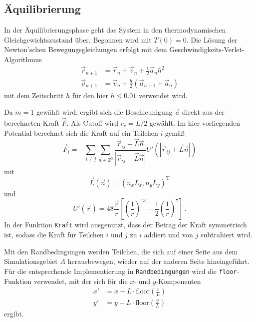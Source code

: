 \subsection*{Äquilibrierung}
In der Äquilibrierungsphase geht das System in den thermodynamischen Gleichgewichtszustand über.
Begonnen wird mit $T(0) = 0$. Die Lösung der Newton'schen Bewegungsgleichungen erfolgt mit dem Geschwindigkeits-Verlet-Algorithmus
\begin{align*}
    \vec{r}_{n+1} &= \vec{r}_n + \vec{v}_n + \frac{1}{2} \vec{a}_n h^2 \\
    \vec{v}_{n+1} &= \vec{v}_n + \frac{h}{2} \left(\vec{a}_{n+1} + \vec{a}_{n}\right)
\end{align*}
mit dem Zeitschritt $h$ für den hier $h \leq 0.01$ verwendet wird. 

Da $m = 1$ gewählt wird, ergibt sich die Beschleunigung $\vec{a}$ direkt aus der berechneten Kraft $\vec{F}$.
Als Cutoff wird $r_c = L/2$ gewählt. Im hier vorliegenden Potential berechnet sich die Kraft auf ein Teilchen $i$ gemäß
\begin{equation*}
    \vec{F}_{i} = - \sum_{i \neq j} \sum_{\vec{n} \in \mathbb{Z}^3} \frac{\vec{r}_{ij} + \vec{L} \vec{n}}{\left|\vec{r}_{ij} + \vec{L} \vec{n}\right|} U'\left(\left|\vec{r}_{ij} + \vec{L} \vec{n}\right|\right)
\end{equation*}
mit
\begin{equation*}
    \vec{L} \left(\vec{n}\right) = \left(n_x L_x, n_y L_y\right)^{\text{T}}
\end{equation*}
und 
\begin{equation*}
    U' \left(\vec{r}\right) = 48 \frac{\vec{r}}{r} \left[\left(\frac{1}{r}\right)^{13} - \frac{1}{2} \left(\frac{1}{r}\right)^{7}\right] \, .
\end{equation*}
In der Funktion \texttt{Kraft} wird ausgenutzt, dass der Betrag der Kraft symmetrisch ist, sodass
die Kraft für Teilchen $i$ und $j$ zu $i$ addiert und von $j$ subtrahiert wird. 

Mit den Randbedingungen werden Teilchen, die sich auf einer Seite aus dem Simulationsgebiet $A$ herausbewegen, wieder auf der anderen Seite 
hineingeführt.
Für die entsprechende Implementierung in \texttt{Randbedingungen} wird die \texttt{floor}-Funktion verwendet, mit der sich 
für die $x$- und $y$-Komponenten
\begin{align*}
    x' &= x - L \cdot \text{floor}\left(\frac{x}{L}\right) \\
    y' &= y - L \cdot \text{floor}\left(\frac{y}{L}\right) 
\end{align*}
ergibt.

